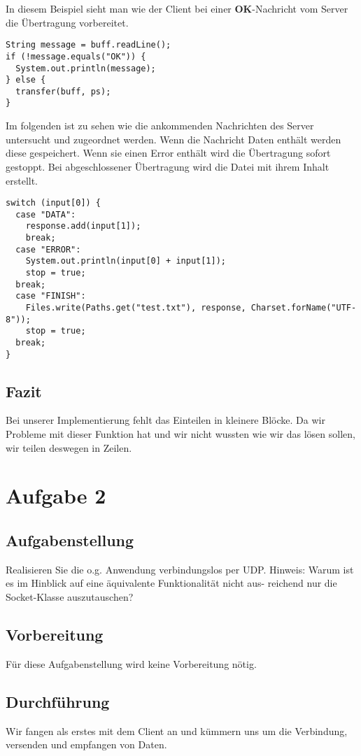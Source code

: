 In diesem Beispiel sieht man wie der Client bei einer \textbf{OK}-Nachricht vom Server die Übertragung vorbereitet.
\begin{lstlisting}
String message = buff.readLine();
if (!message.equals("OK")) {
  System.out.println(message);
} else {
  transfer(buff, ps);
}
\end{lstlisting}

Im folgenden ist zu sehen wie die ankommenden Nachrichten des Server untersucht und zugeordnet werden. Wenn die Nachricht Daten enthält werden diese gespeichert. Wenn sie einen Error enthält wird die Übertragung sofort gestoppt. Bei abgeschlossener Übertragung wird die Datei mit ihrem Inhalt erstellt.
\begin{lstlisting}
switch (input[0]) {
  case "DATA":
    response.add(input[1]);
    break;
  case "ERROR":
    System.out.println(input[0] + input[1]);
    stop = true;
  break;
  case "FINISH":
    Files.write(Paths.get("test.txt"), response, Charset.forName("UTF-8"));
    stop = true;
  break;
}
\end{lstlisting}

\subsection{Fazit}
Bei unserer Implementierung fehlt das Einteilen in kleinere Blöcke. Da wir Probleme mit dieser Funktion hat und wir nicht wussten wie wir das lösen sollen, wir teilen deswegen in Zeilen.


\section{Aufgabe 2}

\subsection{Aufgabenstellung}
Realisieren Sie die o.g. Anwendung verbindungslos per UDP.
Hinweis: Warum ist es im Hinblick auf eine äquivalente Funktionalität nicht aus- reichend nur die Socket-Klasse auszutauschen?

\subsection{Vorbereitung}
Für diese Aufgabenstellung wird keine Vorbereitung nötig.

\subsection{Durchführung}
Wir fangen als erstes mit dem Client an und kümmern uns um die Verbindung, versenden und empfangen von Daten. 

